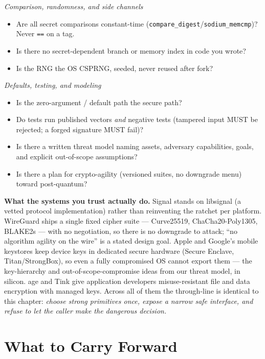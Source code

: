 \begin{focusbox}
\emph{Comparison, randomness, and side channels}
\begin{itemize}
  \item Are all secret comparisons constant-time
  (\texttt{compare\_digest}/\texttt{sodium\_memcmp})? Never \texttt{==} on a tag.
  \item Is there no secret-dependent branch or memory index in code you wrote?
  \item Is the RNG the OS CSPRNG, seeded, never reused after fork?
\end{itemize}

\emph{Defaults, testing, and modeling}
\begin{itemize}
  \item Is the zero-argument / default path the secure path?
  \item Do tests run published vectors \emph{and} negative tests (tampered input
  MUST be rejected; a forged signature MUST fail)?
  \item Is there a written threat model naming assets, adversary capabilities,
  goals, and explicit out-of-scope assumptions?
  \item Is there a plan for crypto-agility (versioned suites, no downgrade menu)
  toward post-quantum?
\end{itemize}
\end{focusbox}

\begin{applicationbox}
\textbf{What the systems you trust actually do.} Signal stands on libsignal (a
vetted protocol implementation) rather than reinventing the ratchet per platform.
WireGuard ships a single fixed cipher suite --- Curve25519, ChaCha20-Poly1305,
BLAKE2s --- with no negotiation, so there is no downgrade to attack; ``no algorithm
agility on the wire'' is a stated design goal. Apple and Google's mobile keystores
keep device keys in dedicated secure hardware (Secure Enclave, Titan/StrongBox), so
even a fully compromised OS cannot export them --- the key-hierarchy and
out-of-scope-compromise ideas from our threat model, in silicon. age and Tink give
application developers misuse-resistant file and data encryption with managed keys.
Across all of them the through-line is identical to this chapter: \emph{choose
strong primitives once, expose a narrow safe interface, and refuse to let the caller
make the dangerous decision.}
\end{applicationbox}

\section{What to Carry Forward}
\label{ch39:carry-forward}

